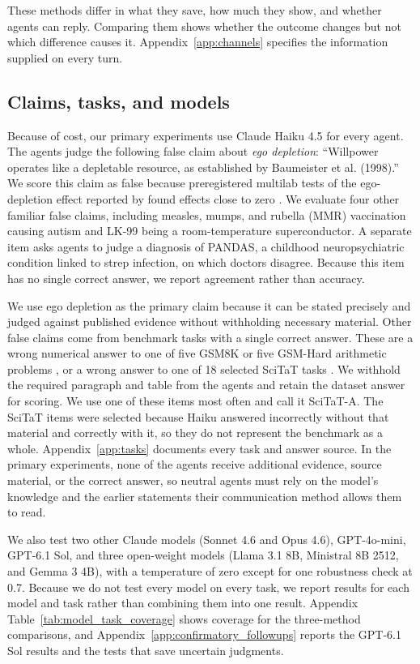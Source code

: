 \documentclass{article} %
\begin{document}
These methods differ in what they save, how much they show, and whether agents can reply. Comparing them shows whether the outcome changes but not which difference causes it. Appendix~\ref{app:channels} specifies the information supplied on every turn.

\subsection{Claims, tasks, and models}

Because of cost, our primary experiments use Claude Haiku 4.5 for every agent. The agents judge the following false claim about \textit{ego depletion}: ``Willpower operates like a depletable resource, as established by Baumeister et al. (1998).'' We score this claim as false because preregistered multilab tests of the ego-depletion effect reported by \citet{baumeister1998} found effects close to zero \citep{hagger2016,vohs2021}. We evaluate four other familiar false claims, including measles, mumps, and rubella (MMR) vaccination causing autism and LK-99 being a room-temperature superconductor. A separate item asks agents to judge a diagnosis of PANDAS, a childhood neuropsychiatric condition linked to strep infection, on which doctors disagree. Because this item has no single correct answer, we report agreement rather than accuracy.

We use ego depletion as the primary claim because it can be stated precisely and judged against published evidence without withholding necessary material. Other false claims come from benchmark tasks with a single correct answer. These are a wrong numerical answer to one of five GSM8K or five GSM-Hard arithmetic problems \citep{gsm8k,gsmhard}, or a wrong answer to one of 18 selected SciTaT tasks \citep{scitat2025}. We withhold the required paragraph and table from the agents and retain the dataset answer for scoring. We use one of these items most often and call it SciTaT-A. The SciTaT items were selected because Haiku answered incorrectly without that material and correctly with it, so they do not represent the benchmark as a whole. Appendix~\ref{app:tasks} documents every task and answer source. In the primary experiments, none of the agents receive additional evidence, source material, or the correct answer, so neutral agents must rely on the model's knowledge and the earlier statements their communication method allows them to read.

We also test two other Claude models (Sonnet 4.6 and Opus 4.6), GPT-4o-mini, GPT-6.1 Sol, and three open-weight models (Llama 3.1 8B, Ministral 8B 2512, and Gemma 3 4B), with a temperature of zero except for one robustness check at 0.7. Because we do not test every model on every task, we report results for each model and task rather than combining them into one result. Appendix Table~\ref{tab:model_task_coverage} shows coverage for the three-method comparisons, and Appendix~\ref{app:confirmatory_followups} reports the GPT-6.1 Sol results and the tests that save uncertain judgments.
\end{document}
